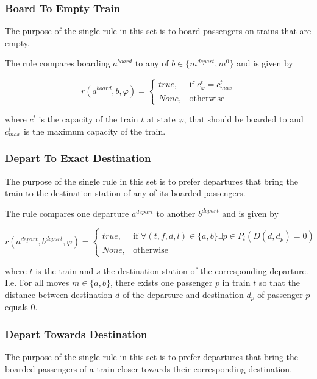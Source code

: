 \documentclass[a4paper,12pt,parskip]{article}
\begin{document}
\subsubsection{Board To Empty Train}
\label{rule:5}

The purpose of the single rule in this set is to board passengers on trains that 
are empty.

The rule compares boarding $a^{board}$ to any of $b \in \{m^{depart}, m^0\}$ and 
is given by 

\[
    r(a^{board}, b, \varphi) = 
    \begin{cases}
        true,& \text{if } c^t_{\varphi} = c^t_{max}\\
        None,& \text{otherwise}
    \end{cases}
\]

where $c^t$ is the capacity of the train $t$ at state $\varphi$, that should be 
boarded to and $c^t_{max}$ is the maximum capacity of the train.

\subsubsection{Depart To Exact Destination}
\label{rule:6}

The purpose of the single rule in this set is to prefer departures that bring the 
train to the destination station of any of its boarded passengers.

The rule compares one departure $a^{depart}$ to another $b^{depart}$ and is 
given by 

\[
    r(a^{depart}, b^{depart}, \varphi) = 
    \begin{cases}
        true,& \text{if } \forall (t,f,d,l) \in \{a,b\} \exists p \in P_t (D(d, d_p) = 0)\\
        None,& \text{otherwise}
    \end{cases}
\]

\noindent where $t$ is the train and $s$ the destination station of the corresponding 
departure. I.e. For all moves $m \in \{a,b\}$, there exists one passenger $p$ in 
train $t$ so that the distance between destination $d$ of the departure and 
destination $d_p$ of passenger $p$ equals $0$.

\subsubsection{Depart Towards Destination}
\label{rule:7}

The purpose of the single rule in this set is to prefer departures that bring the 
boarded passengers of a train closer towards their corresponding destination.
\end{document}
